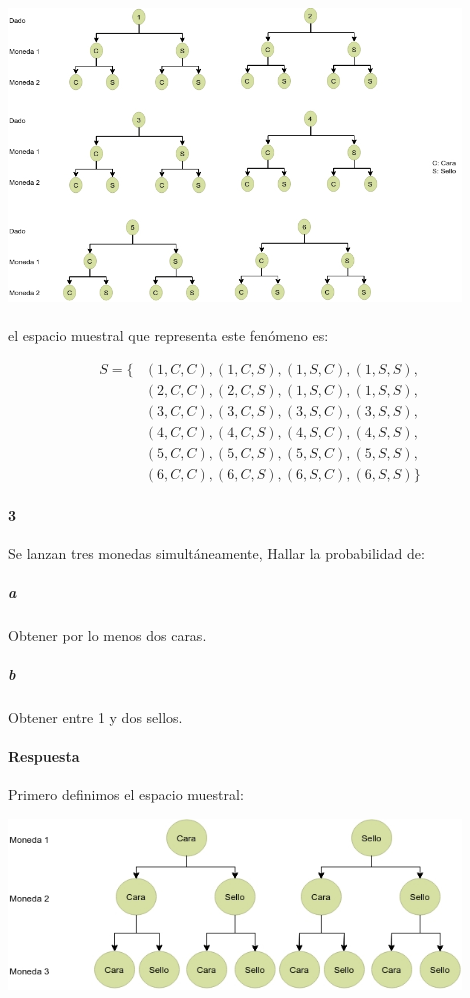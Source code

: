 \documentclass{article}
\begin{document}
\begin{center}
	\includegraphics[width=0.9\textwidth]{1}
\end{center}

\paragraph{}el espacio muestral que representa este fenómeno es:

\begin{align*}
	S = \{ 
		&(1,C,C), (1,C,S), (1,S,C), (1,S,S),\\
		&(2,C,C), (2,C,S), (1,S,C), (1,S,S),\\
		&(3,C,C), (3,C,S), (3,S,C), (3,S,S),\\
		&(4,C,C), (4,C,S), (4,S,C), (4,S,S),\\
		&(5,C,C), (5,C,S), (5,S,C), (5,S,S),\\
		&(6,C,C), (6,C,S), (6,S,C), (6,S,S)
	\}
\end{align*}

\newpage

\paragraph{3} Se lanzan tres monedas simultáneamente, Hallar la probabilidad de:

\subparagraph{a} Obtener por lo menos dos caras.
\subparagraph{b} Obtener entre 1 y dos sellos.

\paragraph{Respuesta} Primero definimos el espacio muestral:

\begin{center}
	\includegraphics[width=0.9\textwidth]{2}
\end{center}
\end{document}
